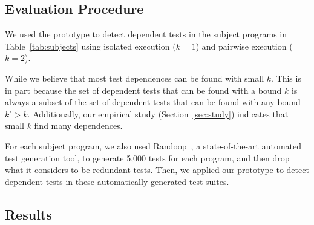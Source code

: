 \subsection{Evaluation Procedure}


We used the prototype to detect dependent
tests in the subject programs in Table~\ref{tab:subjects} using isolated execution ($k = 1$)
and pairwise execution ($k = 2$).

While we believe that most test dependences can be found with small
$k$. This is in part because the set of dependent tests that can be
found with a bound $k$ is always a subset of the set of dependent
tests that can be found with any bound $k' > k$. Additionally, our
empirical study (Section~\ref{sec:study}) indicates that small $k$
find many dependences. 



For each subject program, we also used Randoop~\cite{PachecoLET2007}, a state-of-the-art automated
test generation tool, to generate 5,000 tests
for each program, and then drop what it considers to be redundant
tests. Then, we applied our prototype to detect dependent tests in these automatically-generated
test suites.




\subsection{Results}


